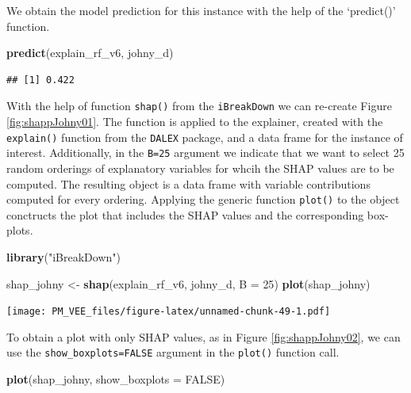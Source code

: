 \documentclass[12pt,]{krantz}
\newenvironment{Shaded}{\begin{snugshade}}{\end{snugshade}}
\newcommand{\DataTypeTok}[1]{\textcolor[rgb]{0.13,0.29,0.53}{#1}}
\newcommand{\DecValTok}[1]{\textcolor[rgb]{0.00,0.00,0.81}{#1}}
\newcommand{\KeywordTok}[1]{\textcolor[rgb]{0.13,0.29,0.53}{\textbf{#1}}}
\newcommand{\NormalTok}[1]{#1}
\newcommand{\OtherTok}[1]{\textcolor[rgb]{0.56,0.35,0.01}{#1}}
\newcommand{\StringTok}[1]{\textcolor[rgb]{0.31,0.60,0.02}{#1}}
\begin{document}
We obtain the model prediction for this instance with the help of the `predict()' function.

\begin{Shaded}
\begin{Highlighting}[]
\KeywordTok{predict}\NormalTok{(explain_rf_v6, johny_d)}
\end{Highlighting}
\end{Shaded}

\begin{verbatim}
## [1] 0.422
\end{verbatim}

With the help of function \texttt{shap()} from the \texttt{iBreakDown} we can re-create Figure \ref{fig:shappJohny01}. The function is applied to the explainer, created with the \texttt{explain()} function from the \texttt{DALEX} package, and a data frame for the instance of interest. Additionally, in the \texttt{B=25} argument we indicate that we want to select 25 random orderings of explanatory variables for whcih the SHAP values are to be computed. The resulting object is a data frame with variable contributions computed for every ordering. Applying the generic function \texttt{plot()} to the object conctructs the plot that includes the SHAP values and the corresponding box-plots.

\begin{Shaded}
\begin{Highlighting}[]
\KeywordTok{library}\NormalTok{(}\StringTok{"iBreakDown"}\NormalTok{)}

\NormalTok{shap_johny <-}\StringTok{ }\KeywordTok{shap}\NormalTok{(explain_rf_v6, johny_d, }\DataTypeTok{B =} \DecValTok{25}\NormalTok{)}
\KeywordTok{plot}\NormalTok{(shap_johny) }
\end{Highlighting}
\end{Shaded}

\texttt{[image: PM\_VEE\_files/figure-latex/unnamed-chunk-49-1.pdf]}

To obtain a plot with only SHAP values, as in Figure \ref{fig:shappJohny02}, we can use the \texttt{show\_boxplots=FALSE} argument in the \texttt{plot()} function call.

\begin{Shaded}
\begin{Highlighting}[]
\KeywordTok{plot}\NormalTok{(shap_johny, }\DataTypeTok{show_boxplots =} \OtherTok{FALSE}\NormalTok{) }
\end{Highlighting}
\end{Shaded}
\end{document}
